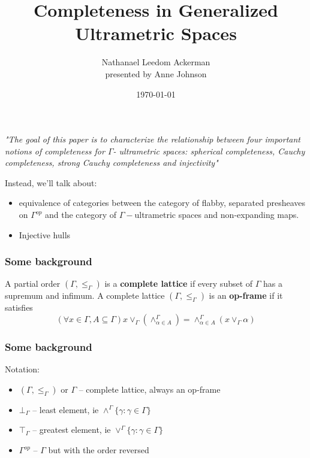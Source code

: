 \documentclass{beamer}
\title{Completeness in Generalized Ultrametric Spaces}
\author{Nathanael Leedom Ackerman\\ presented by Anne Johnson}
\date{\today}
\begin{document}
\maketitle
\begin{frame}
\textit{"The goal of this paper is to characterize the relationship between four important notions of completeness for $\Gamma$- ultrametric spaces: spherical completeness, Cauchy completeness, strong Cauchy completeness and injectivity"}
\end{frame}
\begin{frame}
Instead, we'll talk about:	
	\begin{itemize}
		\item equivalence of categories between the category of flabby, separated presheaves on $\Gamma^{op}$ and the category of $\Gamma-$ultrametric spaces and non-expanding maps.
		\item Injective hulls
	\end{itemize}	
\end{frame}

\begin{frame}
\frametitle{Some background}
\begin{definition}
	A partial order $(\Gamma, \leq_{\Gamma})$ is a \textbf{complete lattice} if every subset of $\Gamma$ has a supremum and infimum. 
	A complete lattice $(\Gamma, \leq_{\Gamma})$ is an \textbf{op-frame} if it satisfies
	\[(\forall x \in \Gamma, A \subseteq \Gamma) x \vee_\Gamma (\wedge_{\alpha \in A}^{\Gamma}) = \wedge_{\alpha \in A}^\Gamma (x \vee_\Gamma \alpha)\]

\end{definition}
\end{frame}
\begin{frame}
\frametitle{Some background}
Notation:
\begin{itemize}
	\item $(\Gamma, \leq_{\Gamma})$ or $\Gamma$ -- complete lattice, always an op-frame
	\item  $\bot_{\Gamma}$ -- least element, ie $\wedge^{\Gamma}\{\gamma:\gamma \in \Gamma\}$ 
	\item $\top_{\Gamma}$ -- greatest element, ie $\vee^{\Gamma}\{\gamma:\gamma \in \Gamma\}$ 
	\item $\Gamma^{op}$ -- $\Gamma$ but with the order reversed
\end{itemize}

\end{frame}
\end{document}
